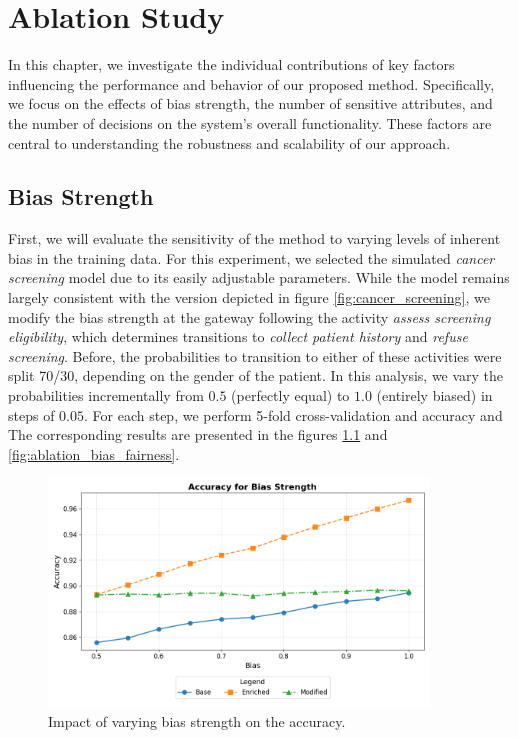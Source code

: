 %
\chapter{Ablation Study}
In this chapter, we investigate the individual contributions of key factors influencing the performance and behavior of our proposed method.
Specifically, we focus on the effects of bias strength, the number of sensitive attributes, and the number of decisions on the system's overall functionality.
These factors are central to understanding the robustness and scalability of our approach.

\section{Bias Strength}
First, we will evaluate the sensitivity of the method to varying levels of inherent bias in the training data.
For this experiment, we selected the simulated \textit{cancer screening} model due to its easily adjustable parameters.
While the model remains largely consistent with the version depicted in figure \ref{fig:cancer_screening},
we modify the bias strength at the gateway following the activity \textit{assess screening eligibility},
which determines transitions to \textit{collect patient history} and \textit{refuse screening}.
Before, the probabilities to transition to either of these activities were split 70/30, depending on the gender of the patient.
In this analysis, we vary the probabilities incrementally from $0.5$ (perfectly equal) to $1.0$ (entirely biased) in steps of $0.05$.
For each step, we perform 5-fold cross-validation and  accuracy and 
The corresponding results are presented in the figures \ref{fig:ablation_bias_accuracy} and \ref{fig:ablation_bias_fairness}.

\begin{figure}[h!]
    \centering
    \includegraphics[width=0.9\textwidth]{gfx/ablation_bias_accuracy.png}
    \caption{Impact of varying bias strength on the accuracy.}
    \label{fig:ablation_bias_accuracy}
\end{figure}

